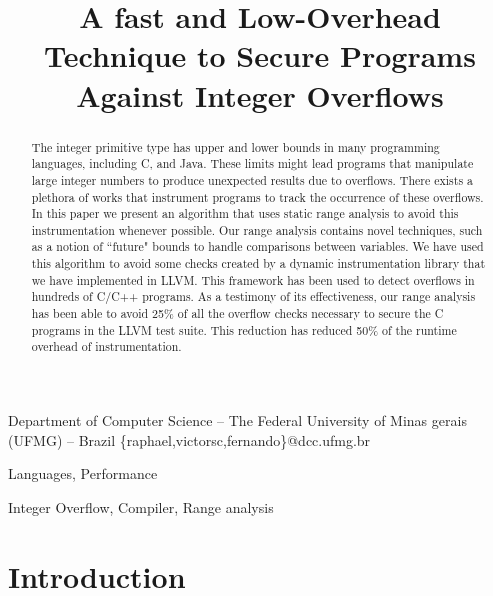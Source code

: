 \documentclass{sigplanconf}[10pt]
\begin{document}
\copyrightdata{[to be supplied]} 


\title{A fast and Low-Overhead Technique to Secure Programs Against
Integer Overflows}

           {Department of Computer Science -- The Federal University of Minas gerais (UFMG) -- Brazil}
           {\{raphael,victorsc,fernando\}@dcc.ufmg.br}

\maketitle

\begin{abstract}
The integer primitive type has upper and lower bounds in many programming
languages, including C, and Java.
These limits might lead programs that manipulate large integer numbers to
produce unexpected results due to overflows.
There exists a plethora of works that instrument programs to track the occurrence
of these overflows.
In this paper we present an algorithm that uses static range analysis to
avoid this instrumentation whenever possible.
Our range analysis contains novel techniques, such as a notion of ``future"
bounds to handle comparisons between variables.
We have used this algorithm to avoid some checks created by a dynamic instrumentation
library that we have implemented in LLVM.
This framework has been used to detect overflows in hundreds of C/C++ programs.
As a testimony of its effectiveness, our range analysis has been able to avoid
25\% of all the overflow checks necessary to secure the C programs in the
LLVM test suite.
This reduction has reduced 50\% of the runtime overhead of instrumentation.
\end{abstract}


\terms
Languages, Performance

\keywords
Integer Overflow, Compiler, Range analysis

\section{Introduction}
\label{sec:int}
\end{document}
